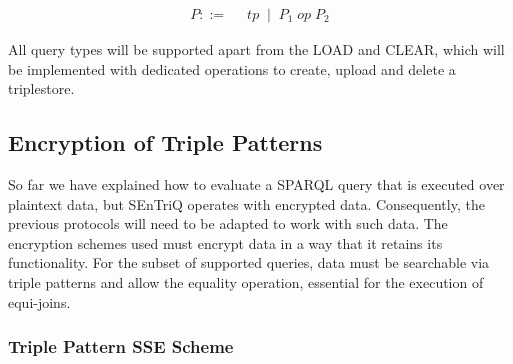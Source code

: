 \begin{equation}
    \begin{split}
        P ::= \;\; & tp \;\;\vert\;\; P_1\; op\; P_2
    \end{split}
\end{equation}

All query types will be supported apart from the LOAD and CLEAR, which will be implemented with dedicated operations to create, upload and delete a triplestore.

\subsection{Encryption of Triple Patterns}
\label{chapter3:definition:triple-pattern-encryption-schemes}

So far we have explained how to evaluate a \gls{SPARQL} query that is executed over plaintext data, but \gls{SEnTriQ} operates with encrypted data. Consequently, the previous protocols will need to be adapted to work with such data. The encryption schemes used must encrypt data in a way that it retains its functionality. For the subset of supported queries, data must be searchable via triple patterns and allow the equality operation, essential for the execution of equi-joins.

\subsubsection{Triple Pattern SSE Scheme}

